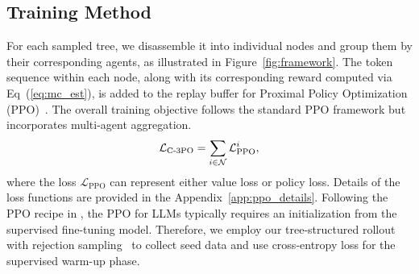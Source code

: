 \subsection{Training Method}\label{sec:optimization}
For each sampled tree, we disassemble it into individual nodes and group them by their corresponding agents, as illustrated in Figure~\ref{fig:framework}.
The token sequence within each node, along with its corresponding reward computed via Eq~(\ref{eq:mc_est}), is added to the replay buffer for Proximal Policy Optimization (PPO)~\citep{SchulmanWDRK17}. 
The overall training objective follows the standard PPO framework but incorporates multi-agent aggregation. 
%
\begin{equation}
    \mathcal{L}_{\text{C-3PO}} = \sum_{i\in\mathcal{N}} \mathcal{L}_{\text{PPO}}^i,
\end{equation}
%
where the loss $\mathcal{L}_{\text{PPO}}$ can represent either value loss or policy loss. 
Details of the loss functions are provided in the Appendix~\ref{app:ppo_details}.
Following the PPO recipe in \citet{Ouyang0JAWMZASR22}, the PPO for LLMs typically requires an initialization from the supervised fine-tuning model.
Therefore, we employ our tree-structured rollout with rejection sampling~\citep{rft} to collect seed data and use cross-entropy loss for the supervised warm-up phase.
